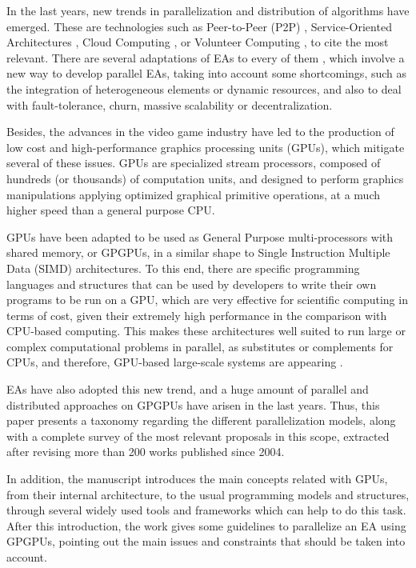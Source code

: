 \documentclass{article}
\begin{document}
In the last years, new trends in parallelization and
distribution of algorithms have emerged. These are technologies such as Peer-to-Peer (P2P) \cite{P2P-wikipedia}, Service-Oriented Architectures \cite{SOA-wikipedia}, Cloud Computing \cite{CloudComputing-wikipedia}, or Volunteer Computing \cite{VolunteerComputing-wikipedia}, to cite the most relevant. There are several adaptations of EAs to every of them \cite{laredo2010evag,SOA-Garcia-SanchezGCAG13,Meri_CloudEA13,Volunteer-LaredoBGVAGF14},
which involve a new way to develop parallel EAs, taking into account some shortcomings, such as the integration of heterogeneous elements or dynamic resources, and also to deal with fault-tolerance, churn, massive
scalability or decentralization.

Besides, the advances in the video game industry have led to the production of low cost and high-performance graphics processing units (GPUs), which mitigate several of these issues.
GPUs are specialized stream processors, composed of hundreds (or
thousands) of computation units, and designed to perform graphics
manipulations applying optimized graphical primitive operations, at a
much higher speed than a general purpose CPU.

GPUs have been adapted to be used as General Purpose multi-processors
with shared memory, or GPGPUs, in a similar shape to Single
Instruction Multiple Data (SIMD)\cite{SIMD-wikipedia} architectures.
To this end, there are specific programming languages and structures that can be used by developers to write their own programs to be run on a GPU, which are very effective for scientific computing in terms of cost, given their extremely high performance in the comparison with CPU-based computing.
This makes these architectures well suited to run large or complex computational problems in parallel, as substitutes or complements for CPUs, and therefore, GPU-based large-scale systems are appearing \cite{KindratenkoTrends11}.

EAs have also adopted this new trend, and a huge amount of parallel and distributed approaches on GPGPUs have arisen in the last years.
Thus, this paper presents a taxonomy regarding the different
parallelization models, along with a complete survey of the most
relevant proposals in this scope, extracted after revising more than
200 works published since 2004.

In addition, the manuscript introduces the main concepts related with
GPUs, from their internal architecture, to the usual programming
models and structures, through several widely used tools and
frameworks which can help to do this task. After this introduction, the work gives some guidelines to parallelize an EA using GPGPUs, pointing out the main issues and constraints that should be taken into account.
\end{document}
